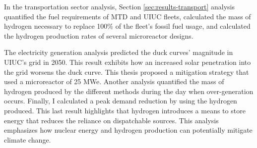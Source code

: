 In the transportation sector analysis, Section \ref{sec:results-transport} analysis quantified the fuel requirements of \gls{MTD} and \gls{UIUC} fleets, calculated the mass of hydrogen necessary to replace 100$\%$ of the fleet's fossil fuel usage, and calculated the hydrogen production rates of several microreactor designs.

The electricity generation analysis predicted the duck curves' magnitude in UIUC's grid in 2050.
This result exhibits how an increased solar penetration into the grid worsens the duck curve.
This thesis proposed a mitigation strategy that used a microreactor of 25 MWe.
Another analysis quantified the mass of hydrogen produced by the different methods during the day when over-generation occurs.
Finally, I calculated a peak demand reduction by using the hydrogen produced.
This last result highlights that hydrogen introduces a means to store energy that reduces the reliance on dispatchable sources.
This analysis emphasizes how nuclear energy and hydrogen production can potentially mitigate climate change.
